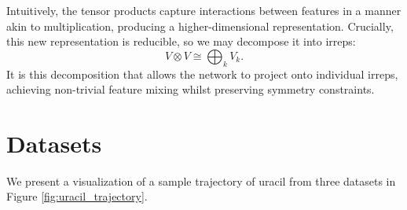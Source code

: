 

Intuitively, the tensor products capture interactions between features in a manner akin to multiplication, producing a higher-dimensional representation.
Crucially, this new representation is reducible, so we may decompose it into irreps:
\[
V \otimes V \cong \bigoplus_k V_k.
\]
It is this decomposition that allows the network to project onto individual irreps, achieving non-trivial feature mixing whilst preserving symmetry constraints.

\section{Datasets}
\label{sec:dataset_construction}

We present a visualization of a sample trajectory of uracil from three datasets in Figure \ref{fig:uracil_trajectory}.


